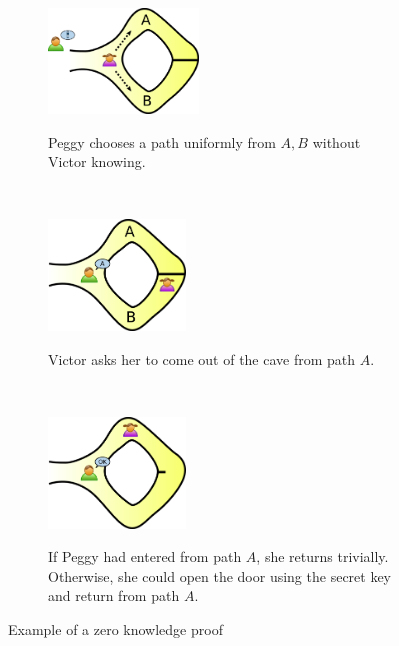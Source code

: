 \begin{figure}[h!]
    \centering
    \begin{subfigure}[b]{0.8\textwidth}
    \centering
        \includegraphics[width=0.44\textwidth]{Figures/Zkip_alibaba1.png}
        \label{fig:bc1}
        \caption{Peggy chooses a path uniformly from $A, B$ without Victor knowing.}
    \end{subfigure}
    \\
    \begin{subfigure}[b]{0.8\textwidth}
    \centering
        \includegraphics[width=0.4\textwidth]{Figures/Zkip_alibaba2.png}
        \label{fig:bc2}
        \caption{Victor asks her to come out of the cave from path $A$.}
    \end{subfigure}
    \\
    \begin{subfigure}[b]{0.8\textwidth}
    \centering
        \includegraphics[width=0.4\textwidth]{Figures/Zkip_alibaba3.png}
        \label{fig:bc3}
        \caption{If Peggy had entered from path $A$, she returns trivially. Otherwise, she could open the door using the secret key and return from path $A$.}
    \end{subfigure}
    
    \caption{Example of a zero knowledge proof}
    \label{fig:zkp_alibaba}
    \end{figure}
    
